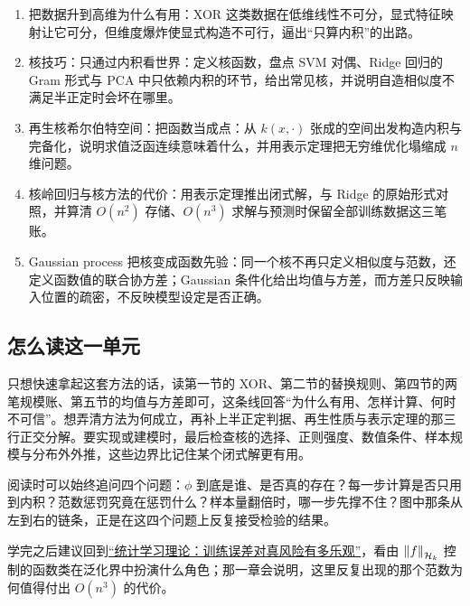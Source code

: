 \begin{enumerate}
\tightlist
\item
  把数据升到高维为什么有用：XOR 这类数据在低维线性不可分，显式特征映射让它可分，但维度爆炸使显式构造不可行，逼出``只算内积''的出路。
\item
  核技巧：只通过内积看世界：定义核函数，盘点 SVM 对偶、Ridge 回归的 Gram 形式与 PCA 中只依赖内积的环节，给出常见核，并说明自造相似度不满足半正定时会坏在哪里。
\item
  再生核希尔伯特空间：把函数当成点：从 \(k(x,\cdot)\) 张成的空间出发构造内积与完备化，说明求值泛函连续意味着什么，并用表示定理把无穷维优化塌缩成 \(n\) 维问题。
\item
  核岭回归与核方法的代价：用表示定理推出闭式解，与 Ridge 的原始形式对照，并算清 \(O(n^{2})\) 存储、\(O(n^{3})\) 求解与预测时保留全部训练数据这三笔账。
\item
  Gaussian process 把核变成函数先验：同一个核不再只定义相似度与范数，还定义函数值的联合协方差；Gaussian 条件化给出均值与方差，而方差只反映输入位置的疏密，不反映模型设定是否正确。
\end{enumerate}

\subsection{怎么读这一单元}

只想快速拿起这套方法的话，读第一节的 XOR、第二节的替换规则、第四节的两笔规模账、第五节的均值与方差即可，这条线回答``为什么有用、怎样计算、何时不可信''。想弄清方法为何成立，再补上半正定判据、再生性质与表示定理的那三行正交分解。要实现或建模时，最后检查核的选择、正则强度、数值条件、样本规模与分布外外推，这些边界比记住某个闭式解更有用。

阅读时可以始终追问四个问题：\(\phi\) 到底是谁、是否真的存在？每一步计算是否只用到内积？范数惩罚究竟在惩罚什么？样本量翻倍时，哪一步先撑不住？图中那条从左到右的链条，正是在这四个问题上反复接受检验的结果。

学完之后建议回到\hyperref[ch:118]{``统计学习理论：训练误差对真风险有多乐观''}，看由 \(\left\lVert f\right\rVert_{\mathcal{H}_k}\) 控制的函数类在泛化界中扮演什么角色；那一章会说明，这里反复出现的那个范数为何值得付出 \(O(n^{3})\) 的代价。
